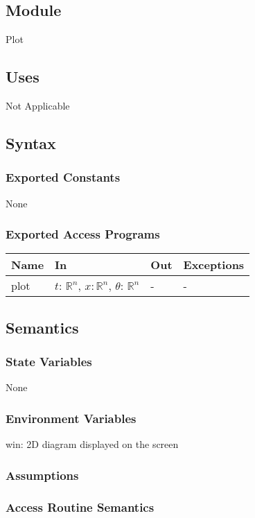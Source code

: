 \documentclass[12pt, titlepage]{article}
\begin{document}
\subsection{Module}
Plot
\subsection{Uses}
Not Applicable

\subsection{Syntax}

\subsubsection{Exported Constants}
None
\subsubsection{Exported Access Programs}
\begin{center}
\begin{tabular}{p{2cm} p{4cm} p{2cm} p{2cm}}
\hline
\textbf{Name} & \textbf{In} & \textbf{Out} & \textbf{Exceptions} \\
\hline
plot & $t$: $\mathbb{R}^{n}$, $x$$: \mathbb{R}^{n}$, $\theta$: $\mathbb{R}^{n}$ & - & - \\

\end{tabular}
\end{center}
\subsection{Semantics}

\subsubsection{State Variables}
None
\subsubsection{Environment Variables}
win: 2D diagram displayed on the screen
\subsubsection{Assumptions}


\subsubsection{Access Routine Semantics}
\end{document}
